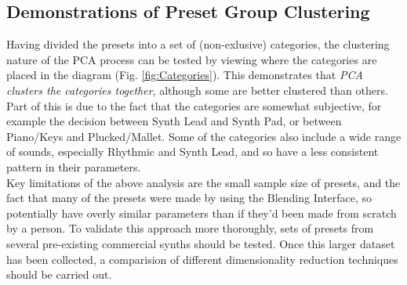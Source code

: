 \documentclass[11pt, oneside]{report}   	%
\begin{document}
\subsection{Demonstrations of Preset Group Clustering}
Having divided the presets into a set of (non-exlusive) categories, the clustering nature of the PCA process can be tested by viewing where the categories are placed in the diagram (Fig. \ref{fig:Categories}). This demonstrates that \emph{PCA clusters the categories together}, although some are better clustered than others. Part of this is due to the fact that the categories are somewhat subjective, for example the decision between Synth Lead and Synth Pad, or between Piano/Keys and Plucked/Mallet. Some of the categories also include a wide range of sounds, especially Rhythmic and Synth Lead, and so have a less consistent pattern in their parameters.\\
Key limitations of the above analysis are the small sample size of presets, and the fact that many of the presets were made by using the Blending Interface, so potentially have overly similar parameters than if they'd been made from scratch by a person. To validate this approach more thoroughly, sets of presets from several pre-existing commercial synths should be tested. Once this larger dataset has been collected, a comparision of different dimensionality reduction techniques should be carried out.
\end{document}
